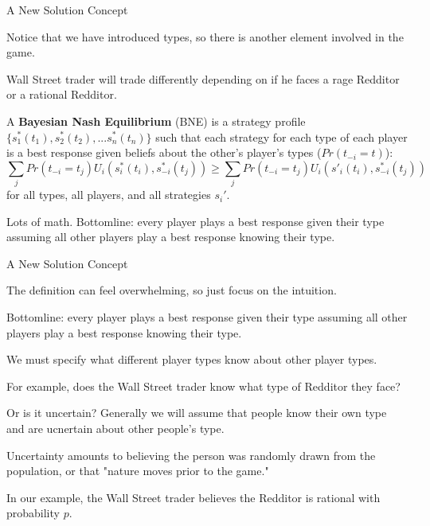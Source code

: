 \documentclass[aspectratio=169]{beamer}
\newenvironment{wideitemize}{\itemize\addtolength{\itemsep}{10pt}}{\enditemize}
\begin{document}
\begin{frame}{A New Solution Concept}
\begin{wideitemize}
    \item Notice that we have introduced types, so there is another element involved in the game.
    \item Wall Street trader will trade differently depending on if he faces a rage Redditor or a rational Redditor.
    \begin{definition}
    A \textbf{Bayesian Nash Equilibrium} (BNE) is a strategy profile $\{s^*_1(t_1), s_2^*(t_2),...s_n^*(t_n)\}$ such that each strategy for each type of each player is a best response given beliefs about the other's player's types ($Pr(t_{-i}=t)$):
    \[\sum_{j} Pr(t_{-i}=t_j)U_i(s^*_i(t_i), s^*_{-i}(t_j)) \geq  \sum_{j} Pr(t_{-i}=t_j)U_i(s'_i(t_i), s^*_{-i}(t_j))\]
    for all types, all players, and all strategies $s_i'$.
    \end{definition}
    \item Lots of math. Bottomline: every player plays a best response given their type assuming all other players play a best response knowing their type.
\end{wideitemize}
\end{frame}

\begin{frame}{A New Solution Concept}
\begin{wideitemize}
    \item The definition can feel overwhelming, so just focus on the intuition.
    \item Bottomline: every player plays a best response given their type assuming all other players play a best response knowing their type.
    \item We must specify what different player types know about other player types.
    \item For example, does the Wall Street trader know what type of Redditor they face?
    \item Or is it uncertain? Generally we will assume that people know their own type and are ucnertain about other people's type.
    \item Uncertainty amounts to believing the person was randomly drawn from the population, or that "nature moves prior to the game."
    \item In our example, the Wall Street trader believes the Redditor is rational with probability $p$.
    
\end{wideitemize}
\end{frame}
\end{document}

